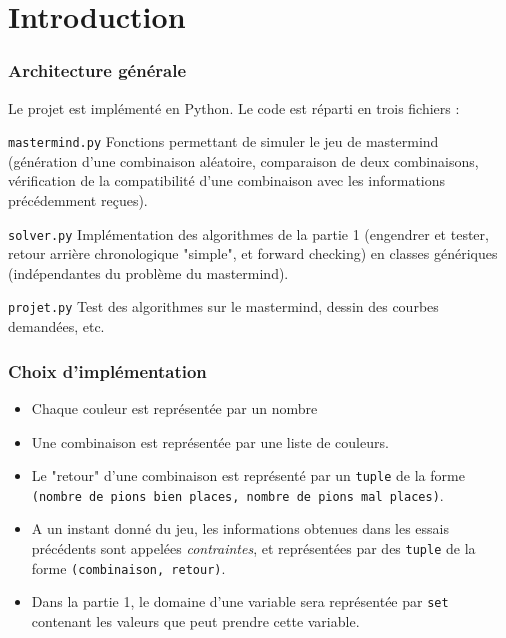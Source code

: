 \documentclass[a4paper, 12pt]{report}
\newcommand{\py}[1]{\texttt{#1}}
\newenvironment{aligneddescription}
	{\begin{tcolorbox}
		\begin{description}[leftmargin=!, labelwidth=\widthof{\bfseries The longest label}]	
	}
	{\end{description}\end{tcolorbox}}
\begin{document}
\part*{Introduction}

\section*{Architecture générale}
Le projet est implémenté en Python. Le code est réparti en trois fichiers :

\begin{aligneddescription}
	\item[\py{mastermind.py}] Fonctions permettant de simuler le jeu de mastermind (génération d'une combinaison aléatoire, comparaison de deux combinaisons, vérification de la compatibilité d'une combinaison avec les informations précédemment reçues).
	
	\item[\py{solver.py}] Implémentation des algorithmes de la partie 1 (engendrer et tester, retour arrière chronologique "simple", et forward checking) en classes génériques (indépendantes du problème du mastermind).
	
	\item[\py{projet.py}] Test des algorithmes sur le mastermind, dessin des courbes demandées, etc.
\end{aligneddescription}

\section*{Choix d'implémentation}

\begin{itemize}
	\item Chaque couleur est représentée par un nombre
	
	\item Une combinaison est représentée par une liste de couleurs.
	
	\item Le "retour" d'une combinaison est représenté par un \py{tuple} de la forme \\
	      \py{(nombre de pions bien places, nombre de pions mal places)}.
	
	\item A un instant donné du jeu, les informations obtenues dans les essais précédents sont appelées \textit{contraintes}, et représentées par des \py{tuple} de la forme \py{(combinaison, retour)}.
	
	\item Dans la partie 1, le domaine d'une variable sera représentée par \py{set} contenant les valeurs que peut prendre cette variable.
\end{itemize}
\end{document}
